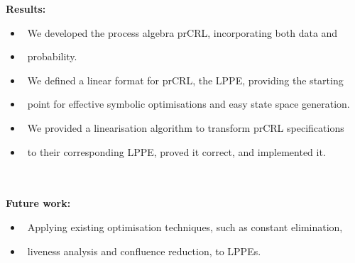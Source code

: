 


\begin{block}{\large {} \vphantom{Introduction}}
\textbf{Results:}
\begin{adjustwidth}{0.5cm}{0.5cm}
\begin{itemize}
\item \ We developed the \alert{process algebra prCRL}, incorporating both \alert{data} and 
\item[] \ \alert{probability}.
\item \ We defined a \alert{linear format for prCRL}, the \alert{LPPE}, providing the starting 
\item[] \ point for effective symbolic optimisations and easy state space generation.
\item \ We provided a \alert{linearisation algorithm} to transform prCRL  specifications 
\item[]\  to their corresponding LPPE, proved it \alert{correct}, and \alert{implemented} it.
\end{itemize}
\end{adjustwidth}

\noindent\\ \phantom{x}\noindent\\

\textbf{Future work:}
\begin{adjustwidth}{0.5cm}{0.5cm}
\begin{itemize}
\item \ Applying existing optimisation techniques, such as \alert{constant elimination},
\item[] \  \alert{liveness analysis} and \alert{confluence reduction}, to LPPEs.
\end{itemize}
\end{adjustwidth}
\vskip10pt
\end{block}

